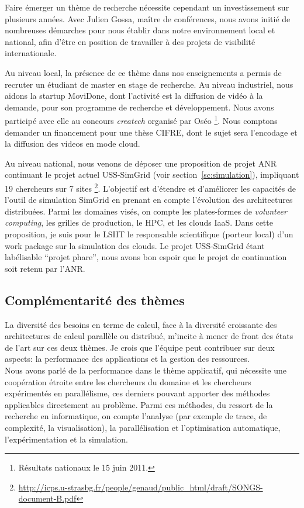 \documentclass[11pt]{article}
\begin{document}
Faire émerger un thème de recherche nécessite cependant un investissement 
sur plusieurs années. Avec Julien Gossa, maître de conférences, nous avons 
initié de nombreuses démarches pour nous établir dans notre environnement 
local et national, afin d'être en position de travailler à des projets
de visibilité internationale. 

Au niveau local, la présence de ce thème dans nos enseignements a permis de 
recruter un étudiant de master en stage de recherche. Au niveau industriel, 
nous aidons la startup MoviDone, dont l'activité est la diffusion de vidéo à 
la demande, pour son programme de recherche et développement. Nous avons 
participé avec elle au concours \textit{createch} organisé par Oséo%
\footnote{Résultats nationaux le 15 juin 2011.}. 
Nous comptons demander un financement pour une thèse CIFRE, dont le sujet 
sera l'encodage et la diffusion des videos en mode cloud. 

Au niveau national, nous venons de déposer une proposition de projet ANR continuant 
le projet actuel USS-SimGrid (voir section~\ref{sc:simulation}), impliquant
19 chercheurs sur 7 sites%
\footnote{\url{http://icps.u-strasbg.fr/people/genaud/public_html/draft/SONGS-document-B.pdf}}. 
L'objectif est d'étendre et d'améliorer les capacités de l'outil de 
simulation SimGrid en prenant en compte l'évolution des architectures 
distribuées. Parmi les domaines visés, on compte les plates-formes de 
\emph{volunteer computing}, les grilles de production, le HPC, et les 
clouds IaaS. Dans cette proposition, je suis pour le LSIIT le responsable 
scientifique (porteur local) d'un work package sur la simulation des clouds.
Le projet USS-SimGrid étant labélisable ``projet phare'', nous avons bon espoir
que le projet de continuation soit retenu par l'ANR. 


\subsection*{Complémentarité des thèmes}

La diversité des besoins en terme de calcul, face à la diversité croissante des
architectures de calcul parallèle ou distribué, m'incite à 
mener de front des états de l'art sur ces deux thèmes. Je crois que l'équipe 
peut contribuer sur deux aspects: la performance des applications et la 
gestion des ressources.\\

Nous avons parlé de la performance dans le thème applicatif, qui nécessite une 
coopération étroite entre les chercheurs du domaine et les chercheurs 
expérimentés en parallélisme, ces derniers pouvant apporter des méthodes 
applicables directement au problème. Parmi ces méthodes, du ressort de la 
recherche en informatique, on compte l'analyse (par exemple de trace, de 
complexité, la visualisation), la parallélisation et l'optimisation automatique, 
l'expérimentation et la simulation.\\
\end{document}
